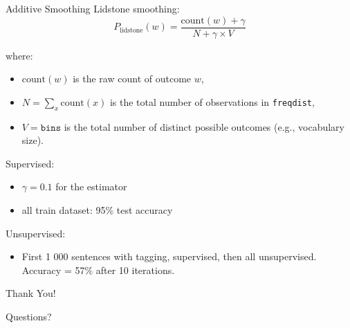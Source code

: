 \documentclass{beamer}
\begin{document}
\begin{frame}{Additive Smoothing}
    Lidstone smoothing:
    \[
    P_{\text{lidstone}}(w) = \frac{\text{count}(w) + \gamma}{N + \gamma \times V}
    \]

    where:

    \begin{itemize}
    \item $\text{count}(w)$ is the raw count of outcome $w$,
    \item $N = \sum_{x} \text{count}(x)$ is the total number of observations in \texttt{freqdist},
    \item $V = \texttt{bins}$ is the total number of distinct possible outcomes (e.g., vocabulary size).
    \end{itemize}
    Supervised:
    \begin{itemize}
        \item $\gamma = 0.1$ for the estimator 
        \item all train dataset: 95\% test accuracy
    \end{itemize}
    Unsupervised:
    \begin{itemize}
        \item First 1 000 sentences with tagging, supervised, then all unsupervised. Accuracy = 57\% after 10 iterations.
    \end{itemize}
    \end{frame}


\begin{frame}{Thank You!}
    \begin{center}
        Questions?
    \end{center}
\end{frame}
\end{document}
